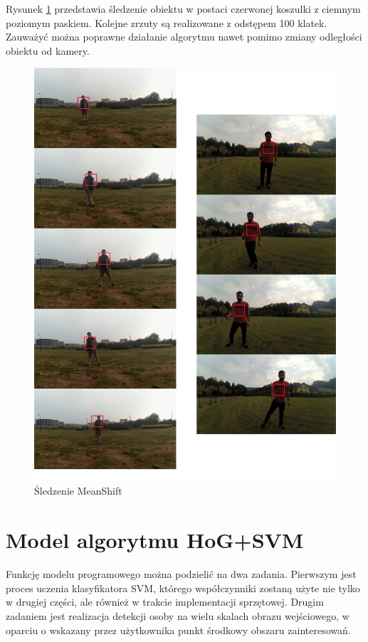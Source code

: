 Rysunek \ref{fig:meanshift_prog} przedstawia śledzenie obiektu w postaci czerwonej koszulki z ciemnym poziomym paskiem. Kolejne zrzuty są realizowane z odstępem 100 klatek. Zauważyć można poprawne działanie algorytmu nawet pomimo zmiany odległości obiektu od kamery.
 
\begin{figure}[]
	\centering
	\includegraphics[width=16cm]{3_meanshift.jpg}
	\caption{Śledzenie MeanShift}
	\label{fig:meanshift_prog}
\end{figure}


\section{Model algorytmu HoG+SVM}

Funkcję modelu programowego można podzielić na dwa zadania. Pierwszym jest proces uczenia klasyfikatora SVM, którego współczynniki zostaną użyte nie tylko w drugiej części, ale również w trakcie implementacji sprzętowej. 
Drugim zadaniem jest realizacja detekcji osoby na wielu skalach obrazu wejściowego, w oparciu o wskazany przez użytkownika punkt środkowy obszaru zainteresowań.
 

